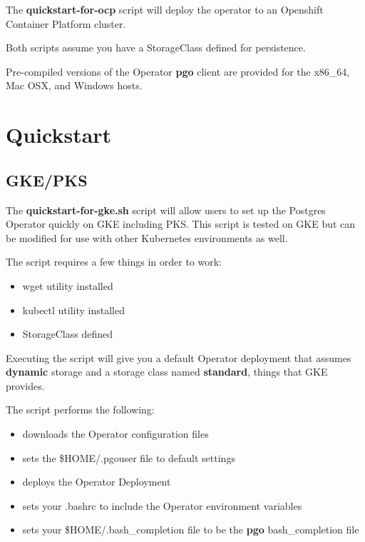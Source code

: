 \documentclass[letterpaper,12pt]{article}
\let\stdsection\section
\renewcommand\section{\newpage\stdsection}
\begin{document}
The \textbf{quickstart-for-ocp} script will deploy the operator to an Openshift Container Platform cluster.

Both scripts assume you have a StorageClass defined for persistence.

Pre-compiled versions of the Operator \textbf{pgo} client are provided for the x86\_64, Mac OSX, and Windows hosts.

\section{Quickstart}\label{/_quickstart}

\subsection{GKE/PKS}\label{/_quickstart/_gke_pks}

The \textbf{quickstart-for-gke.sh} script will allow users to set up the Postgres Operator quickly on GKE including PKS. This script is tested on GKE but can be modified for use with other Kubernetes environments as well.

The script requires a few things in order to work:

\begin{itemize}
    \item wget utility installed 
    \item kubectl utility installed 
    \item StorageClass defined 
\end{itemize}
Executing the script will give you a default Operator deployment that assumes \textbf{dynamic} storage and a storage class named \textbf{standard}, things that GKE provides.

The script performs the following:

\begin{itemize}
    \item downloads the Operator configuration files 
    \item sets the \$HOME/.pgouser file to default settings 
    \item deploys the Operator Deployment 
    \item sets your .bashrc to include the Operator environment variables 
    \item sets your \$HOME/.bash\_completion file to be the \textbf{pgo} bash\_completion file 
\end{itemize}
\end{document}
